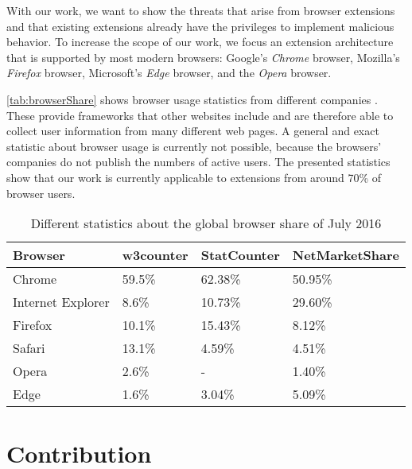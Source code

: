 	With our work, we want to show the threats that arise from browser extensions and that existing extensions already have the privileges to implement malicious behavior. To increase the scope of our work, we focus an extension architecture that is supported by most modern browsers: Google's \textit{Chrome} browser, Mozilla's \textit{Firefox} browser, Microsoft's \textit{Edge} browser, and the \textit{Opera} browser.
	
	\autoref{tab:browserShare} shows browser usage statistics from different companies \cite{w3browserStats, statcounter, netmarketshare}. These provide frameworks that other websites include and are therefore able to collect user information from many different web pages. A general and exact statistic about browser usage is currently not possible, because the browsers' companies do not publish the numbers of active users. The presented statistics show that our work is currently applicable to extensions from around 70\% of browser users.

	\begin{table}
		\centering
		\begin{tabular}{|l|l|l|l|}
			\hline
			\textbf{Browser} & \textbf{w3counter} & \textbf{StatCounter} & \textbf{NetMarketShare} \\ \hline
			Chrome & 59.5\% & 62.38\% & 50.95\% \\ \hline
			Internet Explorer & 8.6\% & 10.73\% & 29.60\% \\ \hline
			Firefox & 10.1\% & 15.43\% & 8.12\% \\ \hline
			Safari & 13.1\% & 4.59\% & 4.51\% \\  \hline
			Opera & 2.6\% & - & 1.40\% \\ \hline
			Edge & 1.6\% & 3.04\% & 5.09\% \\ \hline
		\end{tabular}
		\caption{Different statistics about the global browser share of July 2016 \cite{w3browserStats, statcounter, netmarketshare}}
		\label{tab:browserShare}
	\end{table}	
	
\section{Contribution}
	
